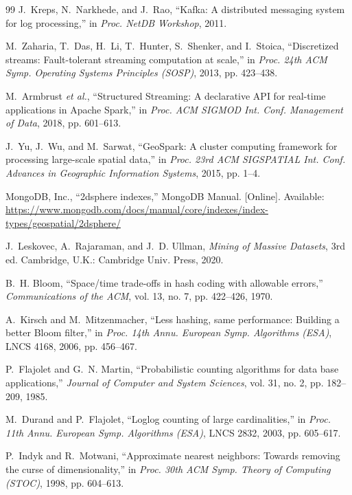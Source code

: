 \documentclass[10pt,journal,compsoc]{IEEEtran}
\begin{document}
\begin{thebibliography}{99}
J.~Kreps, N.~Narkhede, and J.~Rao, ``Kafka: A distributed messaging system for log processing,'' in \textit{Proc. NetDB Workshop}, 2011.

M.~Zaharia, T.~Das, H.~Li, T.~Hunter, S.~Shenker, and I.~Stoica, ``Discretized streams: Fault-tolerant streaming computation at scale,'' in \textit{Proc. 24th ACM Symp. Operating Systems Principles (SOSP)}, 2013, pp. 423--438.

M.~Armbrust \textit{et al.}, ``Structured Streaming: A declarative API for real-time applications in Apache Spark,'' in \textit{Proc. ACM SIGMOD Int. Conf. Management of Data}, 2018, pp. 601--613.

J.~Yu, J.~Wu, and M.~Sarwat, ``GeoSpark: A cluster computing framework for processing large-scale spatial data,'' in \textit{Proc. 23rd ACM SIGSPATIAL Int. Conf. Advances in Geographic Information Systems}, 2015, pp. 1--4.

MongoDB, Inc., ``2dsphere indexes,'' MongoDB Manual. [Online]. Available: \url{https://www.mongodb.com/docs/manual/core/indexes/index-types/geospatial/2dsphere/}

J.~Leskovec, A.~Rajaraman, and J.~D. Ullman, \textit{Mining of Massive Datasets}, 3rd ed. Cambridge, U.K.: Cambridge Univ. Press, 2020.

B.~H. Bloom, ``Space/time trade-offs in hash coding with allowable errors,'' \textit{Communications of the ACM}, vol. 13, no. 7, pp. 422--426, 1970.

A.~Kirsch and M.~Mitzenmacher, ``Less hashing, same performance: Building a better Bloom filter,'' in \textit{Proc. 14th Annu. European Symp. Algorithms (ESA)}, LNCS 4168, 2006, pp. 456--467.

P.~Flajolet and G.~N. Martin, ``Probabilistic counting algorithms for data base applications,'' \textit{Journal of Computer and System Sciences}, vol. 31, no. 2, pp. 182--209, 1985.

M.~Durand and P.~Flajolet, ``Loglog counting of large cardinalities,'' in \textit{Proc. 11th Annu. European Symp. Algorithms (ESA)}, LNCS 2832, 2003, pp. 605--617.

P.~Indyk and R.~Motwani, ``Approximate nearest neighbors: Towards removing the curse of dimensionality,'' in \textit{Proc. 30th ACM Symp. Theory of Computing (STOC)}, 1998, pp. 604--613.


\end{thebibliography}
\end{document}
